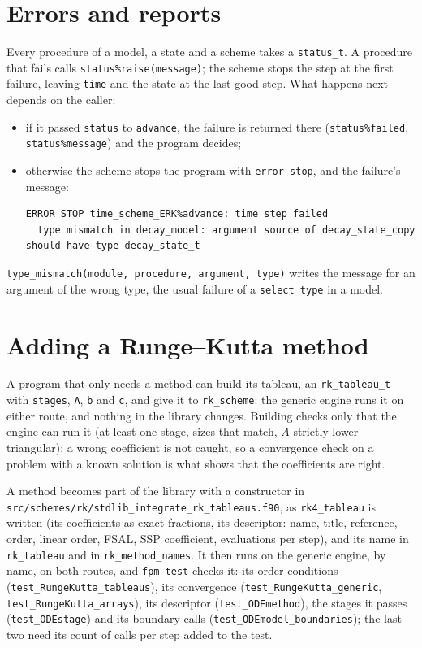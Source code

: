 \documentclass[11pt,a4paper]{article}
\newcommand{\code}[1]{\texttt{#1}}
\begin{document}
\section{Errors and reports}
\label{sec:errors}

Every procedure of a model, a state and a scheme takes a \code{status\_t}.
A procedure that fails calls \code{status\%raise(message)}; the scheme stops
the step at the first failure, leaving \code{time} and the state at the last
good step. What happens next depends on the caller:
\begin{itemize}
  \item if it passed \code{status} to \code{advance}, the failure is returned
    there (\code{status\%failed}, \code{status\%message}) and the program
    decides;
  \item otherwise the scheme stops the program with \code{error stop}, and
    the failure's message:
\begin{lstlisting}[language={},frame=none,basicstyle=\ttfamily\footnotesize,breaklines=true,breakindent=2em]
ERROR STOP time_scheme_ERK%advance: time step failed
  type mismatch in decay_model: argument source of decay_state_copy should have type decay_state_t
\end{lstlisting}
\end{itemize}
\code{type\_mismatch(module, procedure, argument, type)} writes the message
for an argument of the wrong type, the usual failure of a \code{select type}
in a model.

\section{Adding a Runge--Kutta method}
\label{sec:adding}

A program that only needs a method can build its tableau, an
\code{rk\_tableau\_t} with \code{stages}, \code{A}, \code{b} and \code{c}, and
give it to \code{rk\_scheme}: the generic engine runs it on either route, and
nothing in the library changes. Building checks only that the engine can run
it (at least one stage, sizes that match, $A$ strictly lower triangular): a
wrong coefficient is not caught, so a convergence check on a problem with a
known solution is what shows that the coefficients are right.

A method becomes part of the library with a constructor in
\code{src/schemes/rk/stdlib\_integrate\_rk\_tableaus.f90}, as
\code{rk4\_tableau} is written (its coefficients as exact fractions, its
descriptor: name, title, reference, order, linear order, FSAL, SSP coefficient,
evaluations per step), and its name in \code{rk\_tableau} and in
\code{rk\_method\_names}. It then runs on the generic engine, by name, on both
routes, and \code{fpm test} checks it: its order conditions
(\code{test\_RungeKutta\_tableaus}), its convergence
(\code{test\_RungeKutta\_generic}, \code{test\_RungeKutta\_arrays}), its
descriptor (\code{test\_ODEmethod}), the stages it passes
(\code{test\_ODEstage}) and its boundary calls
(\code{test\_ODEmodel\_boundaries}); the last two need its count of calls per
step added to the test.
\end{document}
